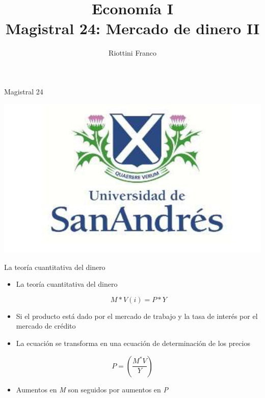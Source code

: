\documentclass{beamer}
\title[Economía I]{Economía I \vspace{4mm}
\\ Magistral 24: Mercado de dinero II}
\date{}
\author[Riottini]{Riottini Franco}
\institute[]{Universidad de San Andrés}
\begin{document}
\begin{frame}
\titlepage
\centering
Magistral 24

\includegraphics[scale=0.2]{../Figures/logoUDESA.jpg} 
\end{frame}



\begin{frame}{La teoría cuantitativa del dinero}
\begin{itemize}
        \item La teoría cuantitativa del dinero
        \vspace{0.3cm}
                \begin{tcolorbox}[width=4in,
                  interior hidden,
                  boxsep=0pt,
                  left=0pt,
                  right=0pt,
                  top=2pt,
                  ]%
                                 $$M*V(i)=P*Y$$
                \end{tcolorbox} 
        \item Si el producto está dado por el mercado de trabajo y la tasa de interés por el mercado de crédito
        \item La ecuación se transforma en una ecuación de determinación de los precios
    \end{itemize}
    \begin{itemize}
    \begin{tcolorbox}[width=4in,
                  interior hidden,
                  boxsep=0pt,
                  left=0pt,
                  right=0pt,
                  top=2pt,
                  ]%
                                 $$P=\left(\frac{M^{*} V}{Y}\right)$$
                \end{tcolorbox} 
    \end{itemize}
    \begin{itemize}
        \item Aumentos en \textit{M} son seguidos por aumentos en \textit{P}
    \end{itemize}
\end{frame}
\end{document}
